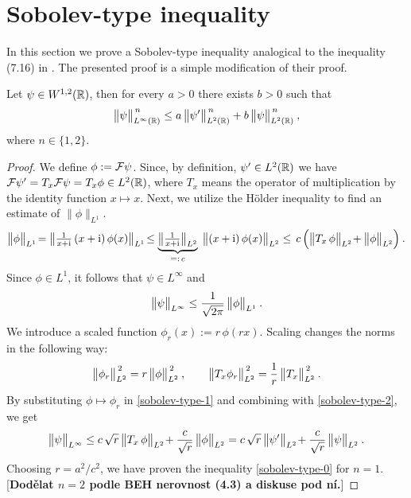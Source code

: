 \section{Sobolev-type inequality}
\label{apdx-sobolev-ineq}

In this section we prove a Sobolev-type inequality analogical to the inequality (7.16) in \cite{BEH}. The presented proof is a simple modification of their proof.
\begin{lemma}
	Let $\psi \in W^{1,2}(\mathbb{R})$, then for every $a>0$ there exists $b>0$ such that
	\begin{equation}
		\big\lVert \psi \big\rVert^{\,n}_{L^\infty(\mathbb{R})}
		\leq
		a \, \big\lVert \psi' \big\rVert^{\,n}_{L^2(\mathbb{R})} +
		b \, \big\lVert \psi \big\rVert^{\,n}_{L^2(\mathbb{R})}
		\: ,
		\label{sobolev-type-0}
	\end{equation}
	where $n \in \{ 1, 2 \}$.
	\label{lemma-sobolev-type-inequality}
\end{lemma}
\begin{proof}
	We define $\phi := \mathcal{F} \psi$. Since, by definition, $\psi' \in L^2(\mathbb{R})$ we have $\mathcal{F} \psi' = T_x \mathcal{F} \psi = T_x \phi \in L^2(\mathbb{R})$, where $T_x$ means the operator of multiplication by the identity function $x \mapsto x$. Next, we utilize the Hölder inequality to find an estimate of $\lVert\phi\rVert_{L^1}$.
	\begin{equation}
		\big\lVert \phi \big\rVert_{L^1}
		\!=
		\big\lVert \tfrac{1}{x+\mathrm{i}} \, (x+\mathrm{i}) \, \phi(x)  \big\rVert_{L^1}
		\!\leq \underbrace{ \big\lVert \tfrac{1}{x+\mathrm{i}} \big\rVert_{L^2} }_{=: \, c}
		\; \big\lVert (x+\mathrm{i}) \, \phi(x) \big\rVert_{L^2}
		\leq \,c\, \Big(
			\big\lVert T_x \, \phi \big\rVert_{L^2} \!+
			\big\lVert \phi \big\rVert_{L^2}
		\Big)
		\: .
		\label{sobolev-type-1}
	\end{equation}
	Since $\phi \in L^1$, it follows that $\psi \in L^\infty$ and
	\begin{equation}
		\big\lVert \psi \big\rVert_{L^\infty}
		\leq \frac{1}{\sqrt{2\pi}} \,
		\big\lVert \phi \big\rVert_{L^1}
		\: .
		\label{sobolev-type-2}
	\end{equation}
	We introduce a scaled function $\phi_r(x) := r \, \phi(r x)$. Scaling changes the norms in the following way:
	\begin{gather*}
		\big\lVert \phi_r \big\rVert_{L^2}^{\,2}
		= r \, \big\lVert \phi \big\rVert_{L^2}^{\,2}
		\: ,
		\qquad
		\big\lVert T_x \phi_r \big\rVert_{L^2}^{\,2}
		= \frac{1}{r} \, \big\lVert T_x \big\rVert_{L^2}^{\,2}
		\: .
	\end{gather*}
	By substituting $\phi \mapsto \phi_r$ in \eqref{sobolev-type-1} and combining with \eqref{sobolev-type-2}, we get
	\begin{gather*}
		\big\lVert \psi \big\rVert_{L^\infty}
		\leq
		c \, \sqrt{r} \, \big\lVert T_x \, \phi \big\rVert_{L^2} \!+
		\frac{c}{\sqrt{r}} \, \big\lVert \phi \big\rVert_{L^2}
		=
		c \, \sqrt{r} \, \big\lVert \psi' \big\rVert_{L^2} \!+
		\frac{c}{\sqrt{r}} \, \big\lVert \psi \big\rVert_{L^2}
		\: .
	\end{gather*}
	Choosing $r = a^2/c^2$, we have proven the inequality \eqref{sobolev-type-0} for $n=1$.
	\\{}[\textbf{Dodělat $n=2$ podle BEH nerovnost (4.3) a diskuse pod ní.}]
\end{proof}
